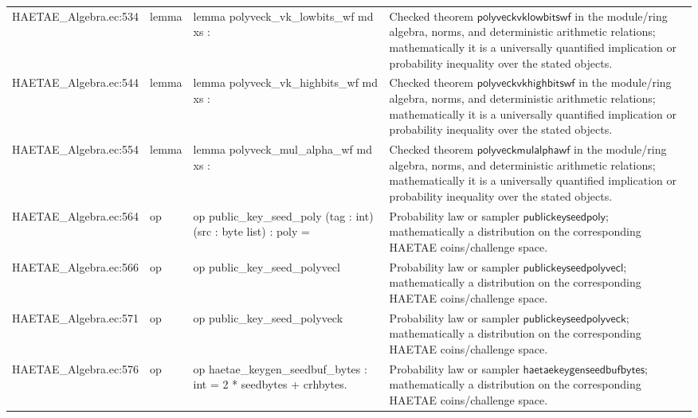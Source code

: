 \documentclass[10pt]{article}
\begin{document}
\begin{longtable}{L{0.11\textwidth}L{0.055\textwidth}L{0.385\textwidth}L{0.41\textwidth}}
HAETAE\_\allowbreak{}Algebra.\allowbreak{}ec:\allowbreak{}534 & lemma & {\ttfamily\scriptsize lemma polyveck\_\allowbreak{}vk\_\allowbreak{}lowbits\_\allowbreak{}wf md xs :} & Checked theorem $\mathsf{polyveckvklowbitswf}$ in the module/ring algebra, norms, and deterministic arithmetic relations; mathematically it is a universally quantified implication or probability inequality over the stated objects. \\
HAETAE\_\allowbreak{}Algebra.\allowbreak{}ec:\allowbreak{}544 & lemma & {\ttfamily\scriptsize lemma polyveck\_\allowbreak{}vk\_\allowbreak{}highbits\_\allowbreak{}wf md xs :} & Checked theorem $\mathsf{polyveckvkhighbitswf}$ in the module/ring algebra, norms, and deterministic arithmetic relations; mathematically it is a universally quantified implication or probability inequality over the stated objects. \\
HAETAE\_\allowbreak{}Algebra.\allowbreak{}ec:\allowbreak{}554 & lemma & {\ttfamily\scriptsize lemma polyveck\_\allowbreak{}mul\_\allowbreak{}alpha\_\allowbreak{}wf md xs :} & Checked theorem $\mathsf{polyveckmulalphawf}$ in the module/ring algebra, norms, and deterministic arithmetic relations; mathematically it is a universally quantified implication or probability inequality over the stated objects. \\
HAETAE\_\allowbreak{}Algebra.\allowbreak{}ec:\allowbreak{}564 & op & {\ttfamily\scriptsize op public\_\allowbreak{}key\_\allowbreak{}seed\_\allowbreak{}poly (tag : int) (src : byte list) : poly =} & Probability law or sampler $\mathsf{publickeyseedpoly}$; mathematically a distribution on the corresponding HAETAE coins/challenge space. \\
HAETAE\_\allowbreak{}Algebra.\allowbreak{}ec:\allowbreak{}566 & op & {\ttfamily\scriptsize op public\_\allowbreak{}key\_\allowbreak{}seed\_\allowbreak{}polyvecl} & Probability law or sampler $\mathsf{publickeyseedpolyvecl}$; mathematically a distribution on the corresponding HAETAE coins/challenge space. \\
HAETAE\_\allowbreak{}Algebra.\allowbreak{}ec:\allowbreak{}571 & op & {\ttfamily\scriptsize op public\_\allowbreak{}key\_\allowbreak{}seed\_\allowbreak{}polyveck} & Probability law or sampler $\mathsf{publickeyseedpolyveck}$; mathematically a distribution on the corresponding HAETAE coins/challenge space. \\
HAETAE\_\allowbreak{}Algebra.\allowbreak{}ec:\allowbreak{}576 & op & {\ttfamily\scriptsize op haetae\_\allowbreak{}keygen\_\allowbreak{}seedbuf\_\allowbreak{}bytes : int = 2 * seedbytes + crhbytes.} & Probability law or sampler $\mathsf{haetaekeygenseedbufbytes}$; mathematically a distribution on the corresponding HAETAE coins/challenge space. \\

\end{longtable}
\end{document}
